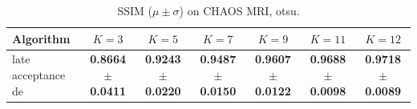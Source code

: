 \begin{table}[htbp]
\centering
\caption{SSIM ($\mu \pm \sigma$) on CHAOS MRI, otsu.}
\label{tab:exp2-otsu-ssim}
\begin{tabular}{lcccccc}
\toprule
Algorithm & $K=3$ & $K=5$ & $K=7$ & $K=9$ & $K=11$ & $K=12$ \\
\midrule
late acceptance de & \textbf{0.8664 $\pm$ 0.0411} & \textbf{0.9243 $\pm$ 0.0220} & \textbf{0.9487 $\pm$ 0.0150} & \textbf{0.9607 $\pm$ 0.0122} & \textbf{0.9688 $\pm$ 0.0098} & \textbf{0.9718 $\pm$ 0.0089} \\
\bottomrule
\end{tabular}
\end{table}